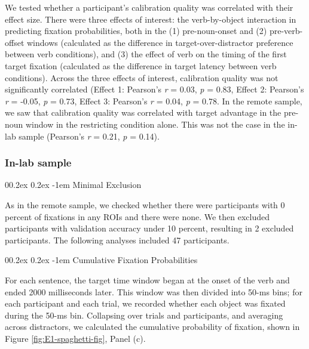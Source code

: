 \documentclass[
  man,floatsintext]{apa6}
\makeatletter
\let\oldparagraph\paragraph
\renewcommand{\paragraph}[1]{\oldparagraph{#1}\mbox{}}
\renewcommand{\paragraph}{\@startsection{paragraph}{4}{\parindent}%
  {0\baselineskip \@plus 0.2ex \@minus 0.2ex}%
  {-1em}%
  {\normalfont\normalsize\bfseries\itshape\typesectitle}}
\makeatother
\begin{document}
We tested whether a participant's calibration quality was correlated with their effect size. There were three effects of interest: the verb-by-object interaction in predicting fixation probabilities, both in the (1) pre-noun-onset and (2) pre-verb-offset windows (calculated as the difference in target-over-distractor preference between verb conditions), and (3) the effect of verb on the timing of the first target fixation (calculated as the difference in target latency between verb conditions). Across the three effects of interest, calibration quality was not significantly correlated (Effect 1: Pearson's \emph{r} = 0.03, \emph{p} = 0.83, Effect 2: Pearson's \emph{r} = -0.05, \emph{p} = 0.73, Effect 3: Pearson's \emph{r} = 0.04, \emph{p} = 0.78. In the remote sample, we saw that calibration quality was correlated with target advantage in the pre-noun window in the restricting condition alone. This was not the case in the in-lab sample (Pearson's \emph{r} = 0.21, \emph{p} = 0.14).

\subsubsection{In-lab sample}\label{in-lab-sample-1}

\paragraph{Minimal Exclusion}\label{minimal-exclusion-1}

As in the remote sample, we checked whether there were participants with 0 percent of fixations in any ROIs and there were none. We then excluded participants with validation accuracy under 10 percent, resulting in 2 excluded participants. The following analyses included 47 participants.

\paragraph{Cumulative Fixation Probabilities}\label{cumulative-fixation-probabilities-1}

For each sentence, the target time window began at the onset of the verb and ended 2000 milliseconds later. This window was then divided into 50-ms bins; for each participant and each trial, we recorded whether each object was fixated during the 50-ms bin. Collapsing over trials and participants, and averaging across distractors, we calculated the cumulative probability of fixation, shown in Figure \ref{fig:E1-spaghetti-fig}, Panel (c).
\end{document}
